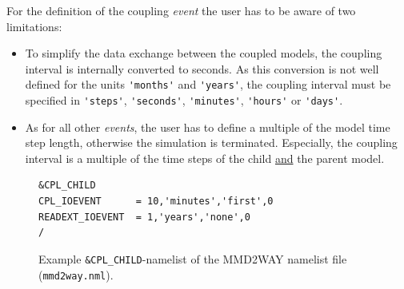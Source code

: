 \documentclass[11pt,twoside]{article}
\newcommand{\blockcode}{\ttfamily\color{OliveGreen}\par}
\begin{document}
For the definition of the coupling {\it event} the user has
to be aware of two limitations:
\begin{itemize}
\item To simplify the data exchange between the
coupled models, the coupling interval is internally converted to seconds. As 
this conversion is not well defined for the units \verb|'months'| and
\verb|'years'|, the coupling interval must be specified in \verb|'steps'|, 
\verb|'seconds'|, \verb|'minutes'|, \verb|'hours'| or \verb|'days'|.
\item As for all other {\it events}, the user has to define a multiple of the 
model time step length, otherwise the simulation is terminated. Especially,
 the coupling interval is a multiple of the time steps of the
 child \underline{and} the parent model.  
\end{itemize}

\begin{figure}
\footnotesize
{\blockcode
\begin{verbatim} 
&CPL_CHILD
CPL_IOEVENT      = 10,'minutes','first',0
READEXT_IOEVENT  = 1,'years','none',0
/
\end{verbatim} 
}
\vspace*{-.7cm}
\caption{Example {\tt \&CPL\_CHILD}-namelist of the MMD2WAY namelist file ({\tt mmd2way.nml}).} 
\label{fig:nmlcplchild} 
\end{figure} 

\end{document}
